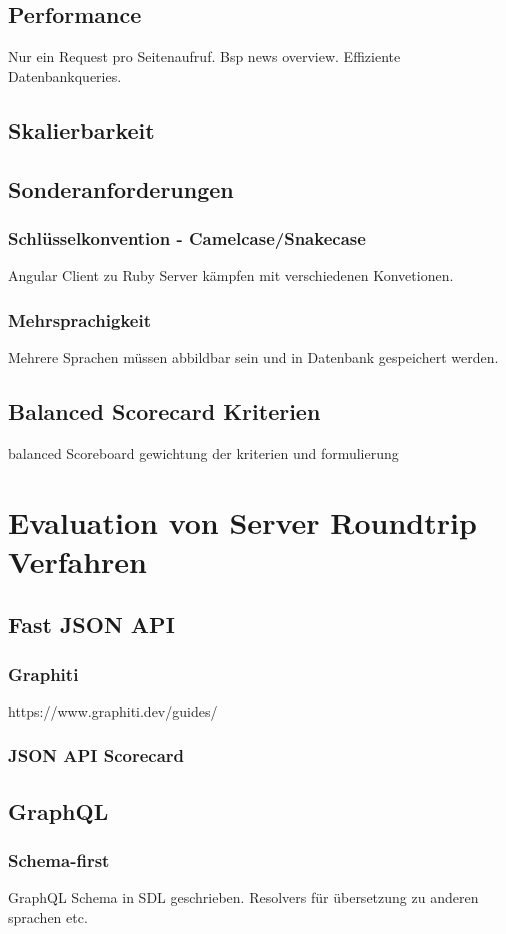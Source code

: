 \section{Performance}
Nur ein Request pro Seitenaufruf. Bsp news overview. Effiziente Datenbankqueries.

\section{Skalierbarkeit}

\section{Sonderanforderungen}
\subsection{Schlüsselkonvention - Camelcase/Snakecase}
Angular Client zu Ruby Server kämpfen mit verschiedenen Konvetionen.
\subsection{Mehrsprachigkeit}
Mehrere Sprachen müssen abbildbar sein und in Datenbank gespeichert werden.
\section{Balanced Scorecard Kriterien}
balanced Scoreboard gewichtung der kriterien und formulierung
\chapter{Evaluation von Server Roundtrip Verfahren}

\section{Fast JSON API}
\subsection{Graphiti}
https://www.graphiti.dev/guides/
\subsection{JSON API Scorecard}
\section{GraphQL}
\subsection{Schema-first}
GraphQL Schema in SDL geschrieben. Resolvers für übersetzung zu anderen sprachen etc.
